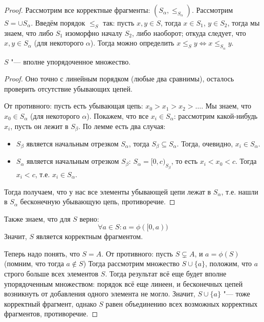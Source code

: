 \begin{proof}
	Рассмотрим все корректные фрагменты: $(S_\alpha, \le_{S_\alpha})$.
	Рассмотрим $S = \cup S_\alpha$.
	Введём порядок $\le_S$ так: пусть $x, y \in S$,
	тогда $x \in S_1$, $y \in S_2$, тогда мы знаем, что либо $S_1$ изоморфно началу $S_2$,
	либо наоборот; откуда следует, что $x, y \in S_\alpha$ (для некоторого $\alpha$).
	Тогда можно определить $x \le_S y \iff x \le_{S_\alpha} y$.

	\begin{assertion}
		$S$ "--- вполне упорядоченное множество.
	\end{assertion}
	\begin{proof}
		Оно точно с линейным порядком (любые два сравнимы), осталось проверить отсутствие убывающих цепей.

		От противного: пусть есть убывающая цепь: $x_0 > x_1 > x_2 > \dots$.
		Мы знаем, что $x_0 \in S_\alpha$ (для некоторого $\alpha$).
		Покажем, что все $x_i \in S_\alpha$:
		рассмотрим какой-нибудь $x_i$, пусть он лежит в $S_\beta$.
		По лемме есть два случая:
		\begin{itemize}
			\item
				$S_\beta$ является начальным отрезком $S_\alpha$, тогда $S_\beta \subseteq S_\alpha$.
				Тогда, очевидно, $x_i \in S_\alpha$.
			\item
				$S_\alpha$ является начальным отрезком $S_\beta$: $S_\alpha = [0, c)_{S_\beta}$,
				то есть $x_i < x_0 < c$.
				Тогда $x_i < c$, т.е. $x_i \in S_\alpha$.
		\end{itemize}
		Тогда получаем, что у нас все элементы убывающей цепи лежат в $S_\alpha$,
		т.е. нашли в $S_\alpha$ бесконечную убывающую цепь, противоречие.
	\end{proof}
	Также знаем, что для $S$ верно:
	\[ \forall a \in S \colon a = \phi([0, a)) \]
	Значит, $S$ является корректным фрагментом.

	Теперь надо понять, что $S = A$.
	От противного: пусть $S \subsetneq A$, и $a = \phi(S)$ (помним, что тогда $a \notin S$)
	Тогда рассмотрим множество $S \cup \{a\}$, положим, что $a$ строго больше всех элементов $S$.
	Тогда результат всё еще будет вполне упорядоченным множеством: порядок всё еще линеен,
	и бесконечных цепей возникнуть от добавления одного элемента не могло.
	Значит, $S \cup \{a \}$ "--- тоже корректный фрагмент, однако $S$ равен объединению всех
	возможных корректных фрагментов, противоречие.
\end{proof}

